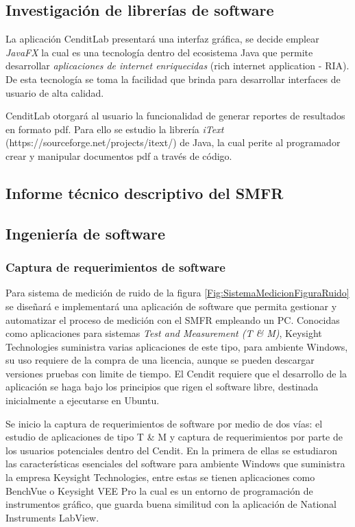 \documentclass[paper=letter,oneside,fontsize=12pt, parskip=full]{article}
\begin{document}
	

	\subsection{Investigación de librerías de software}
	
	La aplicación CenditLab presentará una interfaz gráfica, se decide emplear \emph{JavaFX} la cual es una tecnología dentro del ecosistema Java que permite desarrollar \emph{aplicaciones de internet enriquecidas} (rich internet application - RIA). De esta tecnología se toma la facilidad que brinda para desarrollar interfaces de usuario de alta calidad.
	
	CenditLab otorgará al usuario la funcionalidad de generar reportes de resultados en formato pdf. Para ello se estudio la librería \emph{iText} (https://sourceforge.net/projects/itext/) de Java, la cual perite al programador crear y manipular documentos pdf a través de código.	
	
	\subsection{Informe técnico descriptivo del SMFR}	
	
	\subsection{Ingeniería de software}	
	
	\subsubsection{Captura de requerimientos de software}
	
	Para sistema de medición de ruido de la figura \ref{Fig:SistemaMedicionFiguraRuido} se diseñará e implementará una aplicación de software que permita gestionar y automatizar el proceso de medición con el SMFR empleando un PC. Conocidas como aplicaciones para sistemas \emph{Test and Measurement (T \& M)}, Keysight Technologies suministra varias aplicaciones de este tipo, para ambiente Windows, su uso requiere de la compra de una licencia, aunque se pueden descargar versiones pruebas con limite de tiempo. El Cendit requiere que el desarrollo de la aplicación se haga bajo los principios que rigen el software libre, destinada inicialmente a ejecutarse en Ubuntu.	
	
	Se inicio la captura de requerimientos de software por medio de dos vías: el estudio de aplicaciones de tipo T \& M y captura de requerimientos por parte de los usuarios potenciales dentro del Cendit. En la primera de ellas se estudiaron las características esenciales del software para ambiente Windows que suministra la empresa Keysight Technologies, entre estas se tienen aplicaciones como BenchVue o Keysight VEE Pro la cual es un entorno de programación de instrumentos gráfico, que  guarda buena similitud con la aplicación de National Instruments LabView. 	
	
\end{document}
